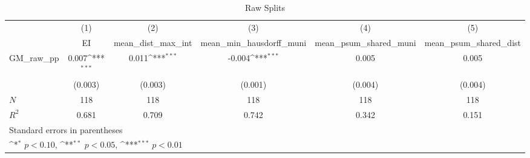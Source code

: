 \begin{table}[htbp]\centering
\def\sym#1{\ifmmode^{#1}\else\(^{#1}\)\fi}
\caption{Raw Splits}
\begin{tabular}{l*{5}{c}}
\hline\hline
            &\multicolumn{1}{c}{(1)}&\multicolumn{1}{c}{(2)}&\multicolumn{1}{c}{(3)}&\multicolumn{1}{c}{(4)}&\multicolumn{1}{c}{(5)}\\
            &\multicolumn{1}{c}{EI}&\multicolumn{1}{c}{mean\_dist\_max\_int}&\multicolumn{1}{c}{mean\_min\_hausdorff\_muni}&\multicolumn{1}{c}{mean\_psum\_shared\_muni}&\multicolumn{1}{c}{mean\_psum\_shared\_dist}\\
\hline
GM\_raw\_pp   &       0.007\sym{***}&       0.011\sym{***}&      -0.004\sym{***}&       0.005         &       0.005         \\
            &     (0.003)         &     (0.003)         &     (0.001)         &     (0.004)         &     (0.004)         \\
\hline
\(N\)       &         118         &         118         &         118         &         118         &         118         \\
\(R^{2}\)   &       0.681         &       0.709         &       0.742         &       0.342         &       0.151         \\
\hline\hline
\multicolumn{6}{l}{\footnotesize Standard errors in parentheses}\\
\multicolumn{6}{l}{\footnotesize \sym{*} \(p<0.10\), \sym{**} \(p<0.05\), \sym{***} \(p<0.01\)}\\
\end{tabular}
\end{table}
